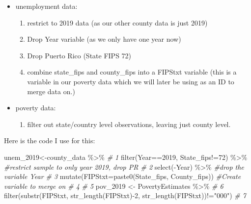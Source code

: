 \documentclass[
]{book}
\newenvironment{Shaded}{\begin{snugshade}}{\end{snugshade}}
\newcommand{\AttributeTok}[1]{\textcolor[rgb]{0.77,0.63,0.00}{#1}}
\newcommand{\CommentTok}[1]{\textcolor[rgb]{0.56,0.35,0.01}{\textit{#1}}}
\newcommand{\DecValTok}[1]{\textcolor[rgb]{0.00,0.00,0.81}{#1}}
\newcommand{\FunctionTok}[1]{\textcolor[rgb]{0.00,0.00,0.00}{#1}}
\newcommand{\NormalTok}[1]{#1}
\newcommand{\OtherTok}[1]{\textcolor[rgb]{0.56,0.35,0.01}{#1}}
\newcommand{\SpecialCharTok}[1]{\textcolor[rgb]{0.00,0.00,0.00}{#1}}
\newcommand{\StringTok}[1]{\textcolor[rgb]{0.31,0.60,0.02}{#1}}
\providecommand{\tightlist}{%
  \setlength{\itemsep}{0pt}\setlength{\parskip}{0pt}}
\begin{document}
\begin{itemize}
\tightlist
\item
  unemployment data:

  \begin{enumerate}
  \def\labelenumi{\arabic{enumi}.}
  \tightlist
  \item
    restrict to 2019 data (as our other county data is just 2019)
  \item
    Drop Year variable (as we only have one year now)
  \item
    Drop Puerto Rico (State FIPS 72)
  \item
    combine state\_fips and county\_fips into a FIPStxt variable (this is a variable in our poverty data which we will later be using as an ID to merge data on.)
  \end{enumerate}
\item
  poverty data:

  \begin{enumerate}
  \def\labelenumi{\arabic{enumi}.}
  \tightlist
  \item
    filter out state/country level observations, leaving just county level.
  \end{enumerate}
\end{itemize}

Here is the code I use for this:

\begin{Shaded}
\begin{Highlighting}[]
\NormalTok{unem\_2019}\OtherTok{\textless{}{-}}\NormalTok{county\_data }\SpecialCharTok{\%\textgreater{}\%}                                                            \CommentTok{\# 1}
  \FunctionTok{filter}\NormalTok{(Year}\SpecialCharTok{==}\DecValTok{2019}\NormalTok{, State\_fips}\SpecialCharTok{!=}\DecValTok{72}\NormalTok{) }\SpecialCharTok{\%\textgreater{}\%} \CommentTok{\#restrict sample to only year 2019, drop PR  \# 2}
  \FunctionTok{select}\NormalTok{(}\SpecialCharTok{{-}}\NormalTok{Year) }\SpecialCharTok{\%\textgreater{}\%} \CommentTok{\#drop the variable Year                                           \# 3}
  \FunctionTok{mutate}\NormalTok{(}\AttributeTok{FIPStxt=}\FunctionTok{paste0}\NormalTok{(State\_fips, County\_fips)) }\CommentTok{\#Create variable to merge on        \# 4}
                                                                                      \CommentTok{\# 5}
\NormalTok{pov\_2019 }\OtherTok{\textless{}{-}}\NormalTok{ PovertyEstimates }\SpecialCharTok{\%\textgreater{}\%}                                                      \CommentTok{\# 6}
  \FunctionTok{filter}\NormalTok{(}\FunctionTok{substr}\NormalTok{(FIPStxt, }\FunctionTok{str\_length}\NormalTok{(FIPStxt)}\SpecialCharTok{{-}}\DecValTok{2}\NormalTok{, }\FunctionTok{str\_length}\NormalTok{(FIPStxt))}\SpecialCharTok{!=}\StringTok{"000"}\NormalTok{)          }\CommentTok{\# 7}
\end{Highlighting}
\end{Shaded}
\end{document}
